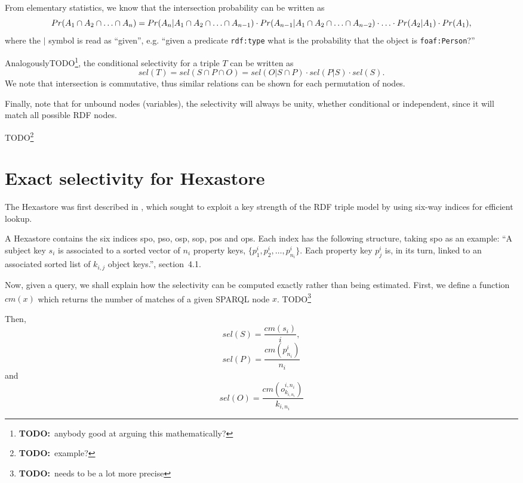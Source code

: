 \documentclass[12pt, draft]{article}
\newcommand{\rdfnode}[1]{\texttt{#1}}
\newcommand{\todo}[1]{\tiny{TODO}\normalsize\footnote{\textbf{TODO:}~#1}}
\begin{document}
From elementary statistics, we know that the intersection probability
can be written as
\begin{equation}
Pr(A_1 \cap A_2  \cap \ldots \cap A_n) = 
  Pr(A_n | A_1 \cap A_2  \cap \ldots \cap A_{n-1}) \\
  \cdot Pr(A_{n-1} | A_1 \cap A_2  \cap \ldots \cap A_{n-2}) 
  \cdot \ldots \cdot Pr(A_2 | A_1) \cdot Pr(A_1) ,
\end{equation}
where the $|$ symbol is read as ``given'', e.g. ``given a predicate
\rdfnode{rdf:type} what is the probability that the object is \rdfnode{foaf:Person}?''

Analogously\todo{anybody good at arguing this mathematically?}, the conditional selectivity for a triple $T$ can be written as 
\begin{equation}
sel(T) = sel(S \cap P \cap O) = sel(O | S \cap P) \cdot sel(P | S)
\cdot sel(S) . 
\end{equation}
We note that intersection is commutative, thus similar
relations can be shown for each permutation of nodes.

Finally, note that for unbound nodes (variables), the selectivity will
always be unity, whether conditional or independent, since it will
match all possible RDF nodes. 

\todo{example?}

\section{Exact selectivity for Hexastore}

The Hexastore was first described in
\cite{Weiss:2008:HSI:1453856.1453965}, which sought to exploit a key
strength of the RDF triple model by using six-way indices for
efficient lookup.

A Hexastore contains the six indices \textsf{spo}, \textsf{pso},
\textsf{osp}, \textsf{sop}, \textsf{pos} and \textsf{ops}. Each index
has the following structure, taking \textsf{spo} as an example: ``A
subject key $s_i$ is associated to a sorted vector of $n_i$ property
keys, $\{p_1^i , p_2^i , \ldots , p^i_{n_i} \}$. Each property key $p_j^i$
is, in its turn, linked to an associated sorted list of $k_{i,j}$
object keys.''\cite{Weiss:2008:HSI:1453856.1453965}, section~4.1.

Now, given a query, we shall explain how the selectivity can be
computed exactly rather than being estimated. First, we define a
function $cm(x)$ which returns the number of matches of a given SPARQL
node $x$. \todo{needs to be a lot more precise}

Then, 
\begin{equation}
sel(S) = \frac{cm(s_i)}{i} ,
\end{equation}
\begin{equation}
sel(P) = \frac{cm(p_{n_i}^i)}{n_i}
\end{equation}
and
\begin{equation}
sel(O) = \frac{cm(o_{k_{i,n_i}}^{i,n_i})}{k_{i,n_i}}
\end{equation}





\end{document}
